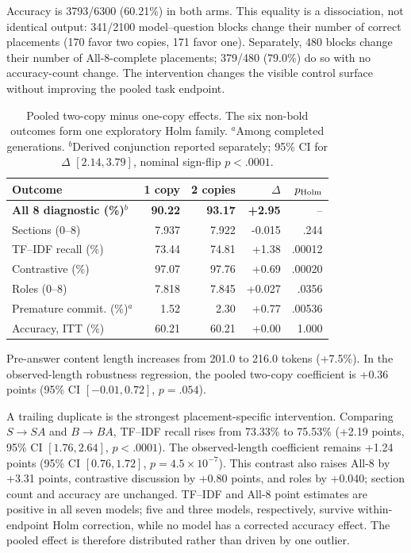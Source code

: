 \documentclass[10pt]{article}
\begin{document}
Accuracy is 3793/6300 (60.21\%) in both arms. This equality is a dissociation, not identical output: 341/2100 model--question blocks change their number of correct placements (170 favor two copies, 171 favor one). Separately, 480 blocks change their number of All-8-complete placements; 379/480 (79.0\%) do so with no accuracy-count change. The intervention changes the visible control surface without improving the pooled task endpoint.

\begin{table}[H]
\centering
\small
\setlength{\tabcolsep}{3.0pt}
\begin{tabular}{@{}lrrrr@{}}
\toprule
Outcome & 1 copy & 2 copies & $\Delta$ & $p_{\rm Holm}$\\
\midrule
\textbf{All 8 diagnostic (\%)}$^{b}$ & \textbf{90.22} & \textbf{93.17} & \textbf{+2.95} & --\\
Sections (0--8) & 7.937 & 7.922 & -0.015 & .244\\
TF--IDF recall (\%) & 73.44 & 74.81 & +1.38 & .00012\\
Contrastive (\%) & 97.07 & 97.76 & +0.69 & .00020\\
Roles (0--8) & 7.818 & 7.845 & +0.027 & .0356\\
Premature commit. (\%)$^{a}$ & 1.52 & 2.30 & +0.77 & .00536\\
Accuracy, ITT (\%) & 60.21 & 60.21 & +0.00 & 1.000\\
\bottomrule
\end{tabular}
\caption{Pooled two-copy minus one-copy effects. The six non-bold outcomes form one exploratory Holm family. $^{a}$Among completed generations. $^{b}$Derived conjunction reported separately; 95\% CI for $\Delta$ $[2.14,3.79]$, nominal sign-flip $p<.0001$.}
\label{tab:main}
\end{table}

Pre-answer content length increases from 201.0 to 216.0 tokens (+7.5\%). In the observed-length robustness regression, the pooled two-copy coefficient is +0.36 points (95\% CI $[-0.01,0.72]$, $p=.054$).

A trailing duplicate is the strongest placement-specific intervention. Comparing $S\rightarrow SA$ and $B\rightarrow BA$, TF--IDF recall rises from 73.33\% to 75.53\% (+2.19 points, 95\% CI $[1.76,2.64]$, $p<.0001$). The observed-length coefficient remains +1.24 points (95\% CI $[0.76,1.72]$, $p=4.5\times10^{-7}$). This contrast also raises All-8 by +3.31 points, contrastive discussion by +0.80 points, and roles by +0.040; section count and accuracy are unchanged. TF--IDF and All-8 point estimates are positive in all seven models; five and three models, respectively, survive within-endpoint Holm correction, while no model has a corrected accuracy effect. The pooled effect is therefore distributed rather than driven by one outlier.
\end{document}

